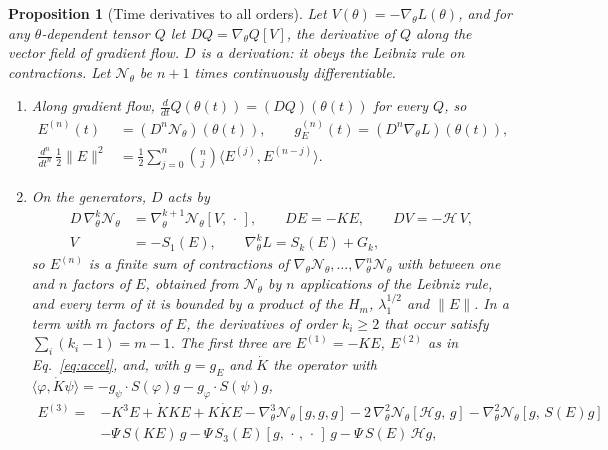 \documentclass[11pt]{article}
\newtheorem{proposition}{Proposition}
\theoremstyle{definition}
\theoremstyle{remark}
\newcommand{\Net}{\mathcal{N}_\theta}    %
\newcommand{\ip}[2]{\langle #1,#2\rangle}
\newcommand{\Hess}{\mathcal{H}}          %
\begin{document}
\begin{proposition}[Time derivatives to all orders]\label{prop:timederiv}
Let $V(\theta) = -\nabla_\theta L(\theta)$, and for any $\theta$-dependent tensor $Q$ let $DQ = \nabla_\theta Q[V]$, the derivative of $Q$ along the vector field of gradient flow.
$D$ is a derivation: it obeys the Leibniz rule on contractions.
Let $\Net$ be $n + 1$ times continuously differentiable.
\begin{enumerate}[label=(\alph*)]
\item Along gradient flow, $\frac{d}{dt}Q(\theta(t)) = (DQ)(\theta(t))$ for every $Q$, so
\begin{equation}\label{eq:Dn}
\begin{aligned}
E^{(n)}(t) &= (D^n\Net)(\theta(t)),\qquad g_E^{(n)}(t) = (D^n\nabla_\theta L)(\theta(t)),\\
\frac{d^n}{dt^n}\,\tfrac12\|E\|^2 &= \tfrac12\sum_{j=0}^n\binom nj\ip{E^{(j)}}{E^{(n-j)}} .
\end{aligned}
\end{equation}
\item On the generators, $D$ acts by
\begin{equation}\label{eq:Dgen}
\begin{aligned}
D\,\nabla^k_\theta\Net &= \nabla^{k+1}_\theta\Net[V,\,\cdot\,],\qquad DE = -KE,\qquad DV = -\Hess\,V,\\
V &= -S_1(E),\qquad \nabla^k_\theta L = S_k(E) + G_k ,
\end{aligned}
\end{equation}
so $E^{(n)}$ is a finite sum of contractions of $\nabla_\theta\Net,\dots,\nabla^n_\theta\Net$ with between one and $n$ factors of $E$, obtained from $\Net$ by $n$ applications of the Leibniz rule, and every term of it is bounded by a product of the $H_m$, $\lambda_1^{1/2}$ and $\|E\|$.
In a term with $m$ factors of $E$, the derivatives of order $k_i\ge2$ that occur satisfy $\sum_i(k_i - 1) = m - 1$.
The first three are $E^{(1)} = -KE$, $E^{(2)}$ as in Eq.~\eqref{eq:accel}, and, with $g = g_E$ and $\dot K$ the operator with $\ip{\varphi}{\dot K\psi} = -g_\psi\cdot S(\varphi)g - g_\varphi\cdot S(\psi)g$,
\begin{equation}\label{eq:E3}
\begin{aligned}
E^{(3)} = {}&-K^3E + \dot KKE + K\dot KE - \nabla^3_\theta\Net[g,g,g] - 2\,\nabla^2_\theta\Net[\Hess g,\,g] - \nabla^2_\theta\Net[g,\,S(E)g]\\
&- \Psi\,S(KE)\,g - \Psi\,S_3(E)[g,\,\cdot\,,\,\cdot\,]\,g - \Psi\,S(E)\,\Hess g ,
\end{aligned}

\end{equation}
\end{enumerate}
\end{proposition}
\end{document}
